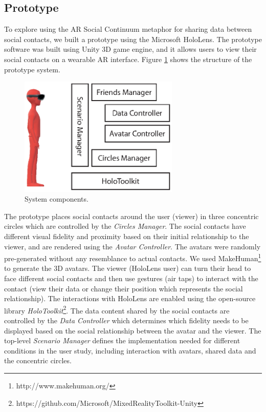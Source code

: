\subsection{Prototype}

To explore using the AR Social Continuum metaphor for sharing data between social contacts, we built a prototype using the Microsoft HoloLens. The prototype software was built using Unity 3D game engine, and it allows users to view their social contacts on a wearable AR interface. Figure \ref{fig:data:system} shows the structure of the prototype system. 

\begin{figure}[ht]
    \centering
    \includegraphics[width=3in]{images/chi/images-03.eps}
    \caption{System components.}
    \label{fig:data:system}
\end{figure}

The prototype places social contacts around the user (viewer) in three concentric circles which are controlled by the \textit{Circles Manager}. The social contacts have different visual fidelity and proximity based on their initial relationship to the viewer, and are rendered using the \textit{Avatar Controller}. The avatars were randomly pre-generated without any resemblance to actual contacts. We used MakeHuman\footnote{http://www.makehuman.org/} to generate the 3D avatars. The viewer (HoloLens user) can turn their head to face different social contacts and then use gestures (air taps) to interact with the contact (view their data or change their position which represents the social relationship). The interactions with HoloLens are enabled using the open-source library \textit{HoloToolkit}\footnote{https://github.com/Microsoft/MixedRealityToolkit-Unity}. The data content shared by the social contacts are controlled by the \textit{Data Controller} which determines which fidelity needs to be displayed based on the social relationship between the avatar and the viewer. The top-level \textit{Scenario Manager} defines the implementation needed for different conditions in the user study, including interaction with avatars, shared data and the concentric circles. 

